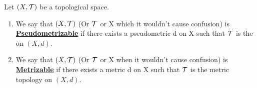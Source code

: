 \newcommand{\Pseudometrizable}[0]{\textbf{\hyperref[def:Pseudometrizable]{Pseudometrizable}}\xspace}
\newcommand{\Metrizable}[0]{\textbf{\hyperref[def:Pseudometrizable]{Metrizable}}\xspace}
\begin{df}
    \label{def:Pseudometrizable}
    Let $(X,\mathcal{T})$ be a topological space. 
    \begin{enumerate}
        \item We say that $(X,\mathcal{T})$ (Or $\mathcal{T}$ or X which it wouldn't cause confusion) is \Pseudometrizable if there exists a pseudometric d on X such that $\mathcal{T}$ is the \PseudometricInducedTopology on $(X,d)$. 
        \item We say that $(X,\mathcal{T})$ (Or $\mathcal{T}$ or X when it wouldn't cause confusion) is \Metrizable if there exists a metric d on X such that $\mathcal{T}$ is the metric topology on $(X,d)$. 
    \end{enumerate}
\end{df}
